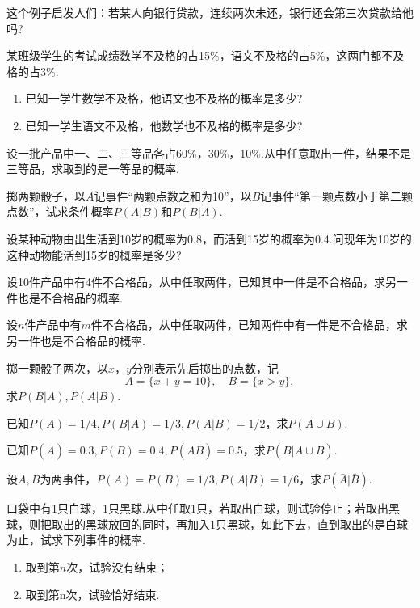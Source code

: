 这个例子启发人们：若某人向银行贷款，连续两次未还，银行还会第三次贷款给他吗?
\begin{xiti}
  \item 某班级学生的考试成绩数学不及格的占15\%，语文不及格的占5\%，这两门都不及格的占3\%.
  \begin{enumerate}
    \item 已知一学生数学不及格，他语文也不及格的概率是多少?
    \item 已知一学生语文不及格，他数学也不及格的概率是多少?
  \end{enumerate}

  \item 设一批产品中一、二、三等品各占60\%，30\%，10\%.从中任意取出一件，结果不是三等品，求取到的是一等品的概率.

  \item 掷两颗骰子，以$A$记事件“两颗点数之和为10”，以$B$记事件“第一颗点数小于第二颗点数”，试求条件概率$P(A|B)$和$P(B|A)$.

  \item 设某种动物由出生活到10岁的概率为0.8，而活到15岁的概率为0.4.问现年为10岁的这种动物能活到15岁的概率是多少?

  \item 设10件产品中有4件不合格品，从中任取两件，已知其中一件是不合格品，求另一件也是不合格品的概率.

  \item 设$n$件产品中有$m$件不合格品，从中任取两件，已知两件中有一件是不合格品，求另一件也是不合格品的概率.

  \item 掷一颗骰子两次，以$x$，$y$分别表示先后掷出的点数，记
    \[
      A = \{ x + y = 10 \},\quad B = \{ x > y \},
    \]
    求$P(B|A),P(A|B)$.

  \item 已知$P(A)=1/4,P(B|A)=1/3,P(A|B)=1/2$，求$P(A\cup B)$.

  \item 已知$P(\bar A)=0.3,P(B)=0.4,P(A\bar B)=0.5$，求$P(B|A\cup \bar B)$.

  \item 设$A,B$为两事件，$P(A)=P(B)=1/3,P(A|B)=1/6$，求$P(\bar A|\bar B)$.

  \item 口袋中有1只白球，1只黑球.从中任取1只，若取出白球，则试验停止；若取出黑球，则把取出的黑球放回的同时，再加入1只黑球，如此下去，直到取出的是白球为止，试求下列事件的概率.
      \begin{enumerate}
        \item 取到第$n$次，试验没有结束；
        \item 取到第n次，试验恰好结束.
      \end{enumerate}


\end{xiti}
